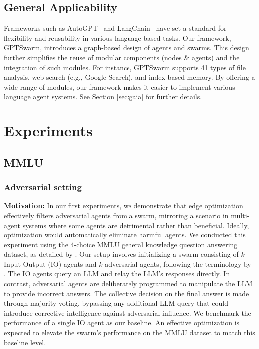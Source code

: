 \documentclass{article}
\theoremstyle{plain}
\theoremstyle{definition}
\theoremstyle{remark}
\begin{document}
\subsection{General Applicability}


Frameworks such as AutoGPT~\citep{autogpt_github} and LangChain~\citep{Chase_LangChain_2022} have set a standard for flexibility and reusability in various language-based tasks.
Our framework, GPTSwarm, introduces a graph-based design of agents and swarms.
This design further simplifies the reuse of modular components (nodes \& agents) and the integration of such modules.
For instance, GPTSwarm supports 41 types of file analysis, web search (e.g., Google Search), and index-based memory.
By offering a wide range of modules, our framework makes it easier to implement various language agent systems.
See Section \ref{sec:gaia} for further details.

\section{Experiments}

\subsection{MMLU}
\subsubsection{Adversarial setting}
\label{sec:adversarial}
\noindent \textbf{Motivation:}
In our first experiments, we demonstrate that edge optimization effectively filters adversarial agents from a swarm, mirroring a scenario in multi-agent systems where some agents are detrimental rather than beneficial.
Ideally, optimization would automatically eliminate harmful agents.
We conducted this experiment using the 4-choice MMLU general knowledge question answering dataset, as detailed by \citet{hendryckstest2021, hendrycks2021ethics}.
Our setup involves initializing a swarm consisting of $k$ Input-Output (IO) agents and $k$ adversarial agents, following the terminology by \citet{besta2023graph}.
The IO agents query an LLM and relay the LLM's responses directly.
In contrast, adversarial agents are deliberately programmed to manipulate the LLM to provide incorrect answers.
The collective decision on the final answer is made through majority voting, bypassing any additional LLM query that could introduce corrective intelligence against adversarial influence.
We benchmark the performance of a single IO agent as our baseline. An effective optimization is expected to elevate the swarm's performance on the MMLU dataset to match this baseline level.
\end{document}
